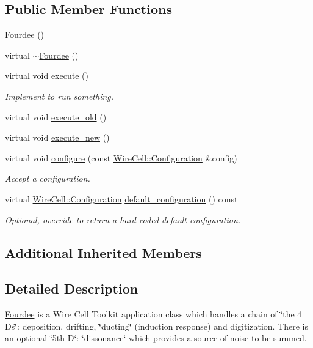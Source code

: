 \subsection*{Public Member Functions}
\begin{DoxyCompactItemize}
\item 
\hyperlink{class_wire_cell_1_1_gen_1_1_fourdee_ad0ed7e328ba4dd5aa5c748075d85783c}{Fourdee} ()
\item 
virtual \hyperlink{class_wire_cell_1_1_gen_1_1_fourdee_ab84cf40afeff0700d886e9c330a844f6}{$\sim$\+Fourdee} ()
\item 
virtual void \hyperlink{class_wire_cell_1_1_gen_1_1_fourdee_ad7e5725da98e74348a3151e9ddd75cde}{execute} ()
\begin{DoxyCompactList}\small\item\em Implement to run something. \end{DoxyCompactList}\item 
virtual void \hyperlink{class_wire_cell_1_1_gen_1_1_fourdee_a2a79017c41d76c2cd942ba1c87eb3106}{execute\+\_\+old} ()
\item 
virtual void \hyperlink{class_wire_cell_1_1_gen_1_1_fourdee_a316c2ab798af8812a737b05ad5a788ae}{execute\+\_\+new} ()
\item 
virtual void \hyperlink{class_wire_cell_1_1_gen_1_1_fourdee_a1ec0263b673e8fa7021737cd2ca5fe16}{configure} (const \hyperlink{namespace_wire_cell_a9f705541fc1d46c608b3d32c182333ee}{Wire\+Cell\+::\+Configuration} \&config)
\begin{DoxyCompactList}\small\item\em Accept a configuration. \end{DoxyCompactList}\item 
virtual \hyperlink{namespace_wire_cell_a9f705541fc1d46c608b3d32c182333ee}{Wire\+Cell\+::\+Configuration} \hyperlink{class_wire_cell_1_1_gen_1_1_fourdee_a36c5e467b00f1598b8063f30aa33d981}{default\+\_\+configuration} () const
\begin{DoxyCompactList}\small\item\em Optional, override to return a hard-\/coded default configuration. \end{DoxyCompactList}\end{DoxyCompactItemize}
\subsection*{Additional Inherited Members}


\subsection{Detailed Description}
\hyperlink{class_wire_cell_1_1_gen_1_1_fourdee}{Fourdee} is a Wire Cell Toolkit application class which handles a chain of \char`\"{}the 4 D\textquotesingle{}s\char`\"{}\+: deposition, drifting, \char`\"{}ducting\char`\"{} (induction response) and digitization. There is an optional \char`\"{}5th D\char`\"{}\+: \char`\"{}dissonance\char`\"{} which provides a source of noise to be summed.

